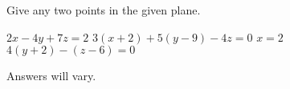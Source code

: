 
\begin{Exercise}[
name={},
title={}, 
difficulty=0,
origin={\cite{GHC}}]
Give any two points in the given plane.
\begin{multicols}{2}
\Question $2x-4y+7z=2$
\Question $3(x+2)+5(y-9)-4z=0$
\Question $x=2$
\Question $4(y+2)-(z-6)=0$
\EndCurrentQuestion
\end{multicols}
\end{Exercise}
\begin{Answer}
Answers will vary.
\end{Answer}
